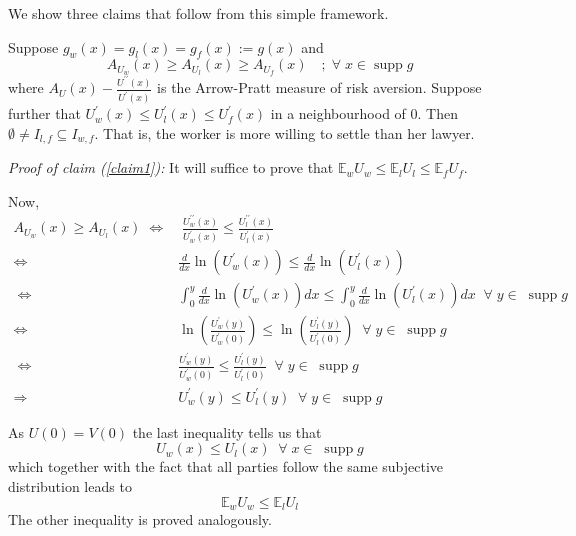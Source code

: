 We show three claims that follow from this simple framework.

\begin{claim}
\label{claim1}
Suppose $g_w(x)=g_l(x)=g_f(x):=g(x)$  and 
\[A_{U_w}(x)\geq A_{U_l}(x)\geq A_{U_f}(x)\quad ;\;\forall\;x\in \operatorname{supp} g \]
where $A_{U}(x)-\frac{U^{\prime\prime}(x)}{U^{\prime}(x)}$ is the Arrow-Pratt measure of risk aversion. Suppose further that $U_w^{\prime}(x)\leq U_l^{\prime}(x)\leq U_f^{\prime}(x)$ in a neighbourhood of $0$. Then $\emptyset\neq I_{l,f}\subseteq I_{w,f}$. That is, the worker is more willing to settle than her lawyer.
\end{claim}

\textit{Proof of claim (\ref{claim1}):}
It will suffice to prove that $\mathbb{E}_wU_w\leq \mathbb{E}_lU_l\leq \mathbb{E}_fU_f$. 

Now, 
\begin{align*}
A_{U_w}(x)\geq A_{U_l}(x)\; \Longleftrightarrow & \; \frac{U_w^{\prime\prime}(x)}{U_w^{\prime}(x)}\leq \frac{U_l^{\prime\prime}(x)}{U_l^{\prime}(x)} \\
\Longleftrightarrow \; & \frac{d}{dx}\ln(U_w^{\prime}(x))\leq \frac{d}{dx}\ln(U_l^{\prime}(x))\\
\;\Longleftrightarrow & \int_0^{y}\frac{d}{dx}\ln(U_w^{\prime}(x))dx\leq \int_0^{y}\frac{d}{dx}\ln(U_l^{\prime}(x))dx \;\;\forall\; y\in\;\operatorname{supp}g\\
\Longleftrightarrow \; & \ln(\frac{U_w^{\prime}(y)}{U_w^{\prime}(0)})\leq \ln(\frac{U_l^{\prime}(y)}{U_l^{\prime}(0)})\;\;\forall\; y\in\;\operatorname{supp}g\\
\; \Longleftrightarrow & \frac{U_w^{\prime}(y)}{U_w^{\prime}(0)}\leq \frac{U_l^{\prime}(y)}{U_l^{\prime}(0)}\;\;\forall\; y\in\;\operatorname{supp}g \\
\Longrightarrow \; & U_w^{\prime}(y)\leq U_l^{\prime}(y)\;\;\forall\; y\in\;\operatorname{supp}g
\end{align*}

As $U(0)=V(0)$ the last inequality tells us that
\[U_w(x)\leq U_l(x)\;\;\forall\; x\in\;\operatorname{supp}g\]
 which together with the fact that all parties follow the same subjective distribution leads to 
 \[\mathbb{E}_wU_w\leq \mathbb{E}_lU_l\]
 The other inequality is proved analogously.


